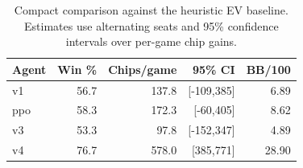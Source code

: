 \begin{table}[t]
\centering
\small
\setlength{\tabcolsep}{4pt}
\begin{tabular}{lrrrr}
\toprule
Agent & Win \% & Chips/game & 95\% CI & BB/100 \\
\midrule
v1 & 56.7 & 137.8 & [-109,385] & 6.89 \\
ppo & 58.3 & 172.3 & [-60,405] & 8.62 \\
v3 & 53.3 & 97.8 & [-152,347] & 4.89 \\
v4 & 76.7 & 578.0 & [385,771] & 28.90 \\
\bottomrule
\end{tabular}
\caption{Compact comparison against the heuristic EV baseline. Estimates use alternating seats and 95\% confidence intervals over per-game chip gains.}
\label{tab:agent_versions_compact}
\end{table}
